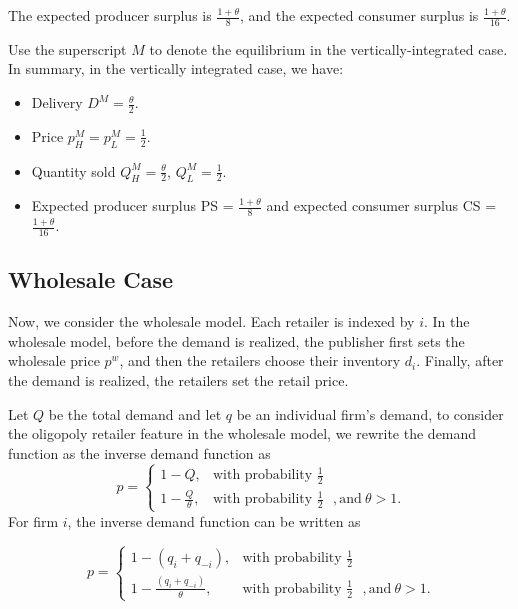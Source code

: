 \documentclass[12pt]{article}
\begin{document}
The expected producer surplus is $\frac{1 + \theta}{8}$, and the expected consumer surplus is $ \frac{1 + \theta}{16}$.

Use the superscript $M$ to denote the equilibrium in the vertically-integrated case. In summary, in the vertically integrated case, we have:
\begin{itemize}
\item Delivery $D^M = \frac{\theta}{2}.$
\item Price $p_{H}^{M} = p_{L}^{M} = \frac{1}{2}$.
\item Quantity sold $Q_{H}^{M} = \frac{\theta}{2}$, $Q_{L}^{M} = \frac{1}{2}$.
\item Expected producer surplus PS = $\frac{1 + \theta}{8}$ and expected consumer surplus CS = $ \frac{1 + \theta}{16}$.

\end{itemize}

\subsection{Wholesale Case}

Now, we consider the wholesale model. Each retailer is indexed by $i$. In the wholesale model, before the demand is realized, the publisher first sets the wholesale price $p^w$, and then the retailers choose their inventory $d_i$. Finally, after the demand is realized, the retailers set the retail price.

Let $Q$ be the total demand and let $q$ be an individual firm's demand,  to consider the oligopoly retailer feature in the wholesale model, we rewrite the demand function as the inverse demand function as
\begin{equation}
	\  p =
	\begin{cases}
		1-Q,  & \text{with probability  $\frac{1}{2}$}\\
		1-\frac{Q}{\theta}, & \text{with probability $\frac{1}{2}$ }, \text{and} \ \theta > 1.
	\end{cases}
\end{equation}
For firm $i$, the inverse demand function can be written as 

\begin{equation}
	\  p =
	\begin{cases}
		1-(q_i + q_{-i}),  & \text{with probability  $\frac{1}{2}$}\\
		1-\frac{(q_i + q_{-i})}{\theta}, & \text{with probability $\frac{1}{2}$ }, \text{and} \ \theta > 1.
	\end{cases}
\end{equation}
\end{document}
